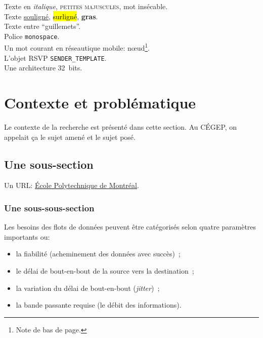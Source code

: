 \label{sec:Introduction}  %
Texte en \emph{italique}, \textsc{petites majuscules}, mot \mbox{insécable}.\\
Texte \ul{souligné}, \hl{surligné}, \textbf{gras}.\\
Texte entre ``guillemets''.\\
Police \texttt{monospace}.\\
Un mot courant en réseautique mobile: n\oe{}ud\footnote{Note de bas de page.}.\\
L'objet RSVP \texttt{SENDER\_TEMPLATE}.\\
Une architecture 32~bits.\\


\section{Contexte et problématique}  %
Le contexte de la recherche est présenté dans cette section. Au CÉGEP, on appelait ça le sujet amené et le sujet posé. 


\subsection{Une sous-section}
Un URL: \href{http://www.polymtl.ca}{École Polytechnique de Montréal}.

\subsubsection{Une sous-sous-section}
Les besoins des flots de données peuvent être catégorisés selon
quatre paramètres importants \cite{Fraas2010} ou:
\begin{itemize}
\item la fiabilité (acheminement des données avec succès)~;
\item le délai de \mbox{bout-en-bout} de la source vers la destination~;
\item la variation du délai de \mbox{bout-en-bout} (\emph{jitter})~;
\item la bande passante requise (le débit des informations).
\end{itemize}

